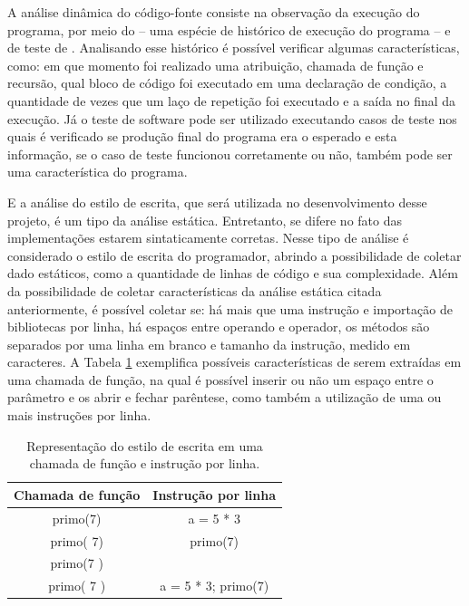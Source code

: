 			A análise dinâmica do código-fonte consiste na observação da execução do
			programa, por meio do  -- uma espécie de histórico de execução
			do programa -- e de teste de . Analisando esse histórico é
			possível verificar algumas características, como: em que momento foi realizado
			uma atribuição, chamada de função e recursão, qual bloco de código foi
			executado em uma declaração de condição, a quantidade de vezes que um laço
			de repetição foi executado e a saída no final da execução. Já o teste de
			software pode ser utilizado executando casos de teste nos quais é verificado
			se produção final do programa era o esperado e esta informação, se o caso de
			teste funcionou corretamente ou não, também pode ser uma característica do programa.
			
			E a análise do estilo de escrita, que será utilizada no desenvolvimento desse projeto,
			é um tipo da análise estática. Entretanto, se difere no fato das implementações estarem
			sintaticamente corretas. Nesse tipo de análise é considerado o estilo de escrita do
			programador, abrindo a possibilidade de coletar dado estáticos, como a quantidade de
			linhas de código e sua complexidade. Além da possibilidade de coletar
			características da análise estática citada anteriormente, é possível coletar se:
			há mais que uma instrução e importação de bibliotecas por linha, há espaços entre
			operando e operador, os métodos são separados por uma linha em branco e tamanho
			da instrução, medido em caracteres. A Tabela \ref{tab:exemploEstEsc} exemplifica
			possíveis características de serem extraídas em uma chamada de função, na qual é
			possível inserir ou não um espaço entre o parâmetro e os  abrir
			e fechar parêntese, como também a utilização de uma ou mais instruções por linha.
			
			\begin{table}
				\centering
				\begin{tabular}{|c|c|}
					\hline
					Chamada de função & Instrução por linha \\ \hline
					primo(7)          & a = 5 * 3  \\
					primo( 7)         & primo(7)     \\
					primo(7 )         &      \\
					primo( 7 )        & a = 5 * 3; primo(7)    \\
					\hline
				\end{tabular}
				\captionsetup{justification=centering}
				\caption[Representação do estilo de escrita]{Representação do estilo
				de escrita em uma chamada de função e instrução por linha.}
				\label{tab:exemploEstEsc}
			\end{table}
			
